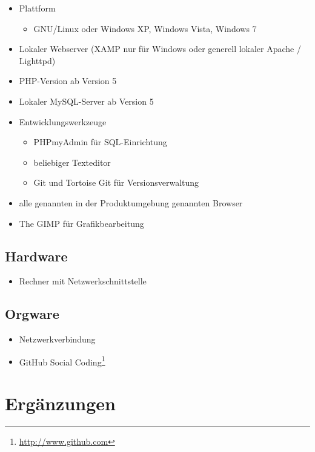 \documentclass[a4paper,oneside]{scrreprt}
\begin{document}
\begin{itemize}
\item Plattform
    \begin{itemize}
    \item GNU/Linux oder Windows XP, Windows Vista, Windows 7
    \end{itemize}

\item Lokaler Webserver (XAMP nur für Windows oder generell lokaler Apache / Lighttpd)
\item PHP-Version ab Version 5
\item Lokaler MySQL-Server ab Version 5
\item Entwicklungswerkzeuge
    \begin{itemize}
    \item PHPmyAdmin für SQL-Einrichtung
    \item beliebiger Texteditor
    \item Git und Tortoise Git für Versionsverwaltung
    \end{itemize}

\item alle genannten in der Produktumgebung genannten Browser
\item The GIMP für Grafikbearbeitung
\end{itemize}

\section{Hardware}

\begin{itemize}
\item Rechner mit Netzwerkschnittstelle
\end{itemize}

\section{Orgware}

\begin{itemize}
\item Netzwerkverbindung
\item GitHub Social Coding\footnote{\url{http://www.github.com}}
\end{itemize}

\chapter{Ergänzungen}
\end{document}
